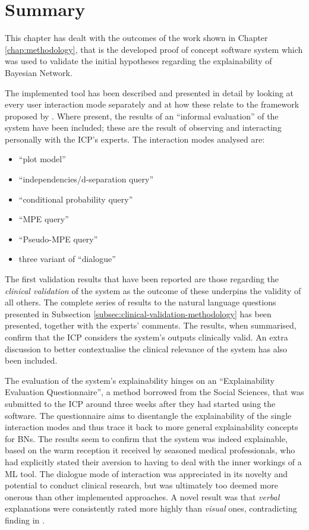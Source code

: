 \section{Summary}
This chapter has dealt with the outcomes of the work shown in Chapter \ref{chap:methodology}, that is the developed proof of concept software system which was used to validate the initial hypotheses regarding the explainability of Bayesian Network.

The implemented tool has been described and presented in detail by looking at every user interaction mode separately and at how these relate to the framework proposed by \citet{lacave2002review}.
Where present, the results of an \enquote{informal evaluation} of the system have been included; these are the result of observing and interacting personally with the ICP's experts.
The interaction modes analysed are:
\begin{itemize}
  \item \enquote{plot model}
  \item \enquote{independencies/d-separation query}
  \item \enquote{conditional probability query}
  \item \enquote{MPE query}
  \item \enquote{Pseudo-MPE query}
  \item three variant of \enquote{dialogue}
\end{itemize}

The first validation results that have been reported are those regarding the \textit{clinical validation} of the system as the outcome of these underpins the validity of all others.
The complete series of results to the natural language questions presented in Subsection \ref{subsec:clinical-validation-methodology} has been presented, together with the experts' comments.
The results, when summarised, confirm that the ICP considers the system's outputs clinically valid.
An extra discussion to better contextualise the clinical relevance of the system has also been included.

The evaluation of the system's explainability hinges on an \enquote{Explainability Evaluation Questionnaire}, a method borrowed from the Social Sciences, that was submitted to the ICP around three weeks after they had started using the software.
The questionnaire aims to disentangle the explainability of the single interaction modes and thus trace it back to more general explainability concepts for BNs.
The results seem to confirm that the system was indeed explainable, based on the warm reception it received by seasoned medical professionals, who had explicitly stated their aversion to having to deal with the inner workings of a ML tool.
The dialogue mode of interaction was appreciated in its novelty and potential to conduct clinical research, but was ultimately too deemed more onerous than other implemented approaches.
A novel result was that \textit{verbal} explanations were consistently rated more highly than \textit{visual} ones, contradicting finding in \citep{lacave2002review}.

